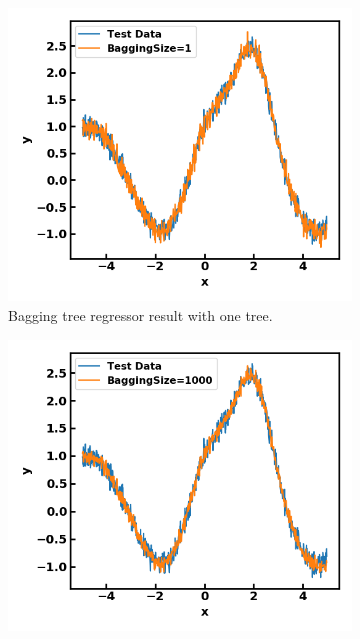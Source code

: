 \begin{refsection}
\begin{figure}[H]
	\centering	
	\begin{subfigure}[b]{0.42\textwidth}
		\centering
		\includegraphics[width=1\linewidth]{../figures/statisticalLearning/treeMethods/BaggingTreeRegressorExampleOneTree}
		\caption{Bagging tree regressor result with one tree.}
	\end{subfigure}\quad
	\begin{subfigure}[b]{0.42\textwidth}
		\centering
		\includegraphics[width=1\linewidth]{../figures/statisticalLearning/treeMethods/BaggingTreeRegressorExampleOneThousandTrees}

\end{subfigure}
\end{figure}
\end{refsection}
